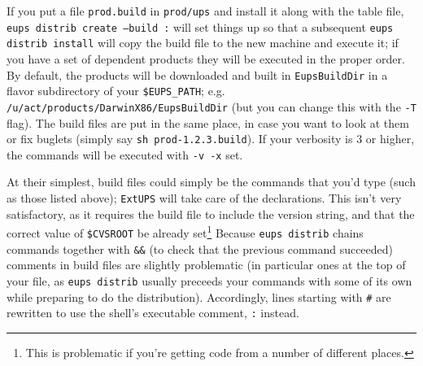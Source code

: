 \documentclass{article}
\newcommand{\code}[1]{\texttt{#1}}
\newcommand{\eups}{\code{ExtUPS}}
\begin{document}
If you put a file \code{prod.build} in \code{prod/ups} and install it along
with the table file, \code{eups distrib create --build :} will set things up
so that a subsequent \code{eups distrib install} will copy the build file
to the new machine and execute it;  if you have a set of dependent products
they will be executed in the proper order.  By default, the products will be downloaded
and built in \code{EupsBuildDir} in a flavor subdirectory of your \code{\$EUPS\_PATH};
e.g. \code{/u/act/products/DarwinX86/EupsBuildDir} (but you can change this with
the \code{-T} flag). The build files are put in the same place, in case you want
to look at them or fix buglets (simply say \code{sh prod-1.2.3.build}).  If your
verbosity is 3 or higher, the commands will be executed with \code{-v -x} set.

At their simplest, build files could simply
be the commands that you'd type (such as those listed above); \eups{} will take
care of the declarations.  This isn't very satisfactory, as it requires the
build file to include the version string, and that the correct value of \code{\$CVSROOT}
be already set\footnote{This is problematic if you're getting code from a number
  of different places.}
Because \code{eups distrib} chains commands together with \code{\&\&} (to check
that the previous command succeeded) comments in build files are slightly
problematic (in particular ones at the top of your file, as \code{eups distrib}
usually preceeds your commands with some of its own while preparing to do
the distribution).  Accordingly, lines starting with \code{\#} are rewritten
to use the shell's executable comment, \code{:} instead.
\end{document}
